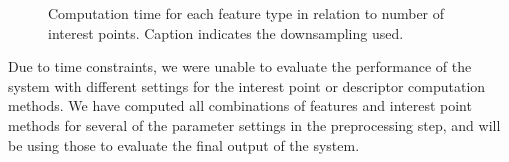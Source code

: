 \documentclass[11pt,a4paper]{kth-mag}
\begin{document}
\begin{figure}
  \caption{Computation time for each feature type in relation to number of
    interest points. Caption indicates the downsampling used.}
  \label{fig:feature_agg}
\end{figure}

Due to time constraints, we were unable to evaluate the performance of the
system with different settings for the interest point or descriptor computation
methods. We have computed all combinations of features and interest point
methods for several of the parameter settings in the preprocessing step, and
will be using those to evaluate the final output of the system.
\end{document}
